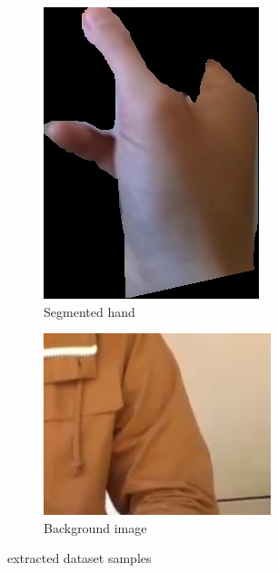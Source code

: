 \begin{figure}
\begin{subfigure}[b]{0.3\textwidth}
        \includegraphics[width=\textwidth]{images/masked/hand231.jpg}
        \caption{Segmented hand}
        \label{fig:three sin x}
    \end{subfigure}
    \hfill
    \begin{subfigure}[b]{0.3\textwidth}
        \centering
        \includegraphics[width=\textwidth]{images/notHand/133.jpg}
        \caption{Background image}
        \label{fig:five over x}
    \end{subfigure}
    \caption{extracted dataset samples}
    \label{fig:three graphs}
\end{figure}

